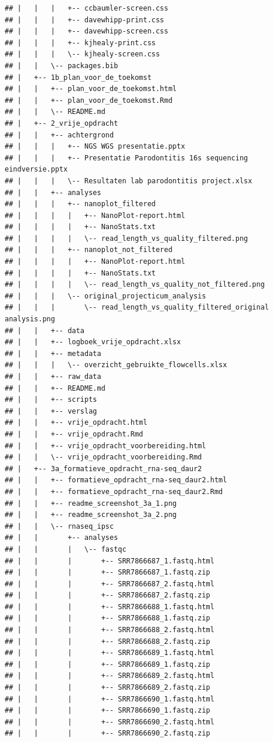 \documentclass[
]{book}
\begin{document}
\begin{verbatim}
## |   |   |   +-- ccbaumler-screen.css
## |   |   |   +-- davewhipp-print.css
## |   |   |   +-- davewhipp-screen.css
## |   |   |   +-- kjhealy-print.css
## |   |   |   \-- kjhealy-screen.css
## |   |   \-- packages.bib
## |   +-- 1b_plan_voor_de_toekomst
## |   |   +-- plan_voor_de_toekomst.html
## |   |   +-- plan_voor_de_toekomst.Rmd
## |   |   \-- README.md
## |   +-- 2_vrije_opdracht
## |   |   +-- achtergrond
## |   |   |   +-- NGS WGS presentatie.pptx
## |   |   |   +-- Presentatie Parodontitis 16s sequencing eindversie.pptx
## |   |   |   \-- Resultaten lab parodontitis project.xlsx
## |   |   +-- analyses
## |   |   |   +-- nanoplot_filtered
## |   |   |   |   +-- NanoPlot-report.html
## |   |   |   |   +-- NanoStats.txt
## |   |   |   |   \-- read_length_vs_quality_filtered.png
## |   |   |   +-- nanoplot_not_filtered
## |   |   |   |   +-- NanoPlot-report.html
## |   |   |   |   +-- NanoStats.txt
## |   |   |   |   \-- read_length_vs_quality_not_filtered.png
## |   |   |   \-- original_projecticum_analysis
## |   |   |       \-- read_length_vs_quality_filtered_original analysis.png
## |   |   +-- data
## |   |   +-- logboek_vrije_opdracht.xlsx
## |   |   +-- metadata
## |   |   |   \-- overzicht_gebruikte_flowcells.xlsx
## |   |   +-- raw_data
## |   |   +-- README.md
## |   |   +-- scripts
## |   |   +-- verslag
## |   |   +-- vrije_opdracht.html
## |   |   +-- vrije_opdracht.Rmd
## |   |   +-- vrije_opdracht_voorbereiding.html
## |   |   \-- vrije_opdracht_voorbereiding.Rmd
## |   +-- 3a_formatieve_opdracht_rna-seq_daur2
## |   |   +-- formatieve_opdracht_rna-seq_daur2.html
## |   |   +-- formatieve_opdracht_rna-seq_daur2.Rmd
## |   |   +-- readme_screenshot_3a_1.png
## |   |   +-- readme_screenshot_3a_2.png
## |   |   \-- rnaseq_ipsc
## |   |       +-- analyses
## |   |       |   \-- fastqc
## |   |       |       +-- SRR7866687_1.fastq.html
## |   |       |       +-- SRR7866687_1.fastq.zip
## |   |       |       +-- SRR7866687_2.fastq.html
## |   |       |       +-- SRR7866687_2.fastq.zip
## |   |       |       +-- SRR7866688_1.fastq.html
## |   |       |       +-- SRR7866688_1.fastq.zip
## |   |       |       +-- SRR7866688_2.fastq.html
## |   |       |       +-- SRR7866688_2.fastq.zip
## |   |       |       +-- SRR7866689_1.fastq.html
## |   |       |       +-- SRR7866689_1.fastq.zip
## |   |       |       +-- SRR7866689_2.fastq.html
## |   |       |       +-- SRR7866689_2.fastq.zip
## |   |       |       +-- SRR7866690_1.fastq.html
## |   |       |       +-- SRR7866690_1.fastq.zip
## |   |       |       +-- SRR7866690_2.fastq.html
## |   |       |       +-- SRR7866690_2.fastq.zip

\end{verbatim}
\end{document}
